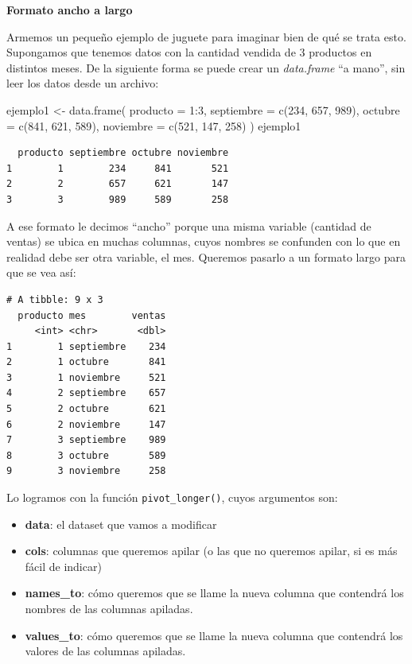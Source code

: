 \documentclass[
]{book}
\newenvironment{Shaded}{\begin{snugshade}}{\end{snugshade}}
\newcommand{\AttributeTok}[1]{\textcolor[rgb]{0.77,0.63,0.00}{#1}}
\newcommand{\DecValTok}[1]{\textcolor[rgb]{0.00,0.00,0.81}{#1}}
\newcommand{\FunctionTok}[1]{\textcolor[rgb]{0.00,0.00,0.00}{#1}}
\newcommand{\NormalTok}[1]{#1}
\newcommand{\OtherTok}[1]{\textcolor[rgb]{0.56,0.35,0.01}{#1}}
\newcommand{\SpecialCharTok}[1]{\textcolor[rgb]{0.00,0.00,0.00}{#1}}
\providecommand{\tightlist}{%
  \setlength{\itemsep}{0pt}\setlength{\parskip}{0pt}}
\begin{document}
\textbf{Formato ancho a largo}

Armemos un pequeño ejemplo de juguete para imaginar bien de qué se trata esto. Supongamos que tenemos datos con la cantidad vendida de 3 productos en distintos meses. De la siguiente forma se puede crear un \emph{data.frame} ``a mano'', sin leer los datos desde un archivo:

\begin{Shaded}
\begin{Highlighting}[]
\NormalTok{ejemplo1 }\OtherTok{\textless{}{-}} \FunctionTok{data.frame}\NormalTok{(}
  \AttributeTok{producto =} \DecValTok{1}\SpecialCharTok{:}\DecValTok{3}\NormalTok{,}
  \AttributeTok{septiembre =} \FunctionTok{c}\NormalTok{(}\DecValTok{234}\NormalTok{, }\DecValTok{657}\NormalTok{, }\DecValTok{989}\NormalTok{),}
  \AttributeTok{octubre =} \FunctionTok{c}\NormalTok{(}\DecValTok{841}\NormalTok{, }\DecValTok{621}\NormalTok{, }\DecValTok{589}\NormalTok{),}
  \AttributeTok{noviembre =} \FunctionTok{c}\NormalTok{(}\DecValTok{521}\NormalTok{, }\DecValTok{147}\NormalTok{, }\DecValTok{258}\NormalTok{)}
\NormalTok{)}
\NormalTok{ejemplo1}
\end{Highlighting}
\end{Shaded}

\begin{verbatim}
  producto septiembre octubre noviembre
1        1        234     841       521
2        2        657     621       147
3        3        989     589       258
\end{verbatim}

A ese formato le decimos ``ancho'' porque una misma variable (cantidad de ventas) se ubica en muchas columnas, cuyos nombres se confunden con lo que en realidad debe ser otra variable, el mes. Queremos pasarlo a un formato largo para que se vea así:

\begin{verbatim}
# A tibble: 9 x 3
  producto mes        ventas
     <int> <chr>       <dbl>
1        1 septiembre    234
2        1 octubre       841
3        1 noviembre     521
4        2 septiembre    657
5        2 octubre       621
6        2 noviembre     147
7        3 septiembre    989
8        3 octubre       589
9        3 noviembre     258
\end{verbatim}

Lo logramos con la función \texttt{pivot\_longer()}, cuyos argumentos son:

\begin{itemize}
\tightlist
\item
  \textbf{data}: el dataset que vamos a modificar
\item
  \textbf{cols}: columnas que queremos apilar (o las que no queremos apilar, si es más fácil de indicar)
\item
  \textbf{names\_to}: cómo queremos que se llame la nueva columna que contendrá los nombres de las columnas apiladas.
\item
  \textbf{values\_to}: cómo queremos que se llame la nueva columna que contendrá los valores de las columnas apiladas.
\end{itemize}
\end{document}
